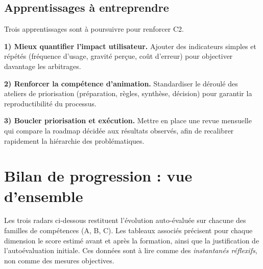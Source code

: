 \subsection{Apprentissages à entreprendre}

Trois apprentissages sont à poursuivre pour renforcer C2.

\textbf{1) Mieux quantifier l'impact utilisateur.}
Ajouter des indicateurs simples et répétés (fréquence d'usage, gravité perçue, coût d'erreur) pour objectiver davantage les arbitrages.

\textbf{2) Renforcer la compétence d'animation.}
Standardiser le déroulé des ateliers de priorisation (préparation, règles, synthèse, décision) pour garantir la reproductibilité du processus.

\textbf{3) Boucler priorisation et exécution.}
Mettre en place une revue mensuelle qui compare la roadmap décidée aux résultats observés, afin de recalibrer rapidement la hiérarchie des problématiques.


\section{Bilan de progression : vue d'ensemble}
\label{sec:bilan-progression}

Les trois radars ci-dessous restituent l'évolution auto-évaluée sur chacune des familles de compétences (A, B, C). Les tableaux associés précisent pour chaque dimension le score estimé avant et après la formation, ainsi que la justification de l'autoévaluation initiale. Ces données sont à lire comme des \emph{instantanés réflexifs}, non comme des mesures objectives.

